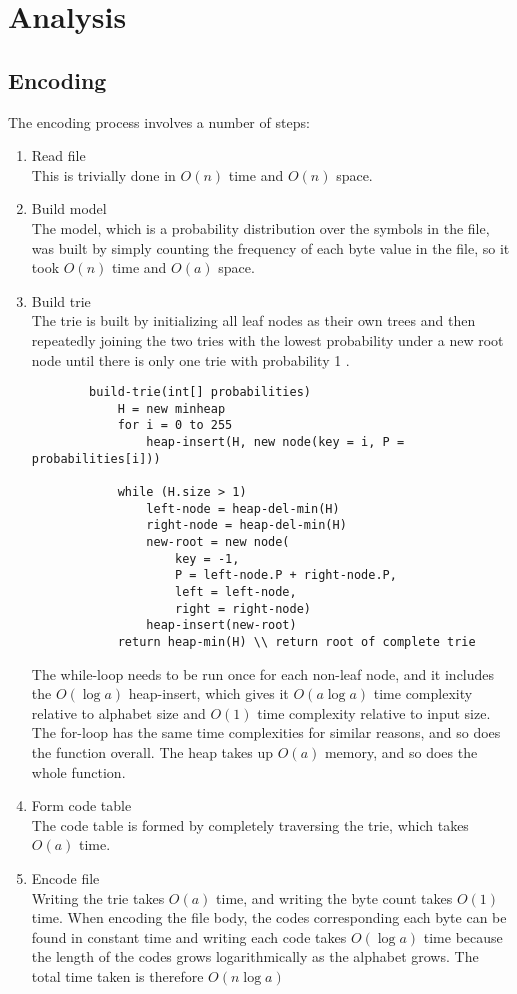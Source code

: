 \documentclass[11pt,a4paper,oneside,notitlepage,final]{article}
\begin{document}
	\section{Analysis}
	\subsection{Encoding}
	The encoding process involves a number of steps:
	\vspace{-0.8em}
	\begin{enumerate}
		\item Read file\\
		This is trivially done in $ O(n) $ time and $ O(n) $ space.
		\item Build model\\
		The model, which is a probability distribution over the symbols in the file, was built by simply counting the frequency of each byte value in the file, so it took $ O(n) $ time and $ O(a) $ space.
		\item Build trie\\
		The trie is built by initializing all leaf nodes as their own trees and then repeatedly joining the two tries with the lowest probability under a new root node until there is only one trie with probability 1 \cite{mahoney2012data}.
		\begin{lstlisting}
		build-trie(int[] probabilities)
			H = new minheap
			for i = 0 to 255
				heap-insert(H, new node(key = i, P = probabilities[i]))
			
			while (H.size > 1)
				left-node = heap-del-min(H)
				right-node = heap-del-min(H)
				new-root = new node(
					key = -1,
					P = left-node.P + right-node.P,
					left = left-node,
					right = right-node)
				heap-insert(new-root)
			return heap-min(H) \\ return root of complete trie
		\end{lstlisting}
		The while-loop needs to be run once for each non-leaf node, and it includes the $ O(\log a) $ heap-insert, which gives it $ O(a \log a) $ time complexity relative to alphabet size and $ O(1) $ time complexity relative to input size. The for-loop has the same time complexities for similar reasons, and so does the function overall. The heap takes up $ O(a) $ memory, and so does the whole function.
		
		\item Form code table\\
		The code table is formed by completely traversing the trie, which takes $ O(a) $ time.
		
		\item Encode file\\
		Writing the trie takes $ O(a) $ time, and writing the byte count takes $ O(1) $ time.
		When encoding the file body, the codes corresponding each byte can be found in constant time and writing each code takes $ O(\log a) $ time because the length of the codes grows logarithmically as the alphabet grows. The total time taken is therefore $ O(n \log a) $
	\end{enumerate}
	
\end{document}
